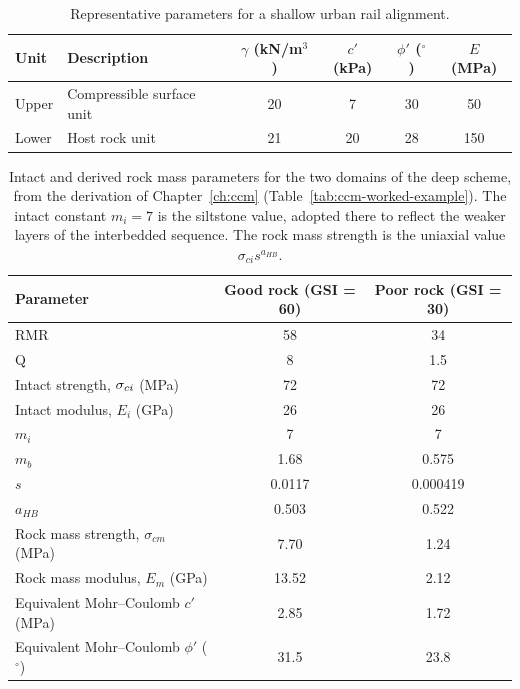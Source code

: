 \begin{table}[htbp]
\caption{Representative parameters for a shallow urban rail alignment.}
\label{tab:shallow-alignment-params}
\centering
\small
\begin{tabular}{l l c c c c}
\toprule
\textbf{Unit} & \textbf{Description} & $\gamma$ (kN/m$^3$) & $c'$ (kPa) & $\phi'$ ($^\circ$) & $E$ (MPa) \\
\midrule
Upper & Compressible surface unit & 20 & 7 & 30 & 50 \\
Lower & Host rock unit & 21 & 20 & 28 & 150 \\
\bottomrule
\end{tabular}
\end{table}

\begin{table}[htbp]
\caption{Intact and derived rock mass parameters for the two domains of the deep scheme, from the derivation of Chapter~\ref{ch:ccm} (Table~\ref{tab:ccm-worked-example}). The intact constant $m_i = 7$ is the siltstone value, adopted there to reflect the weaker layers of the interbedded sequence. The rock mass strength is the uniaxial value $\sigma_{ci} s^{a_{HB}}$.}
\label{tab:deep-scheme-params}
\centering
\small
\begin{tabular}{l c c}
\toprule
\textbf{Parameter} & \textbf{Good rock (GSI = 60)} & \textbf{Poor rock (GSI = 30)} \\
\midrule
RMR & 58 & 34 \\
Q & 8 & 1.5 \\
Intact strength, $\sigma_{ci}$ (MPa) & 72 & 72 \\
Intact modulus, $E_i$ (GPa) & 26 & 26 \\
$m_i$ & 7 & 7 \\
$m_b$ & 1.68 & 0.575 \\
$s$ & 0.0117 & 0.000419 \\
$a_{HB}$ & 0.503 & 0.522 \\
Rock mass strength, $\sigma_{cm}$ (MPa) & 7.70 & 1.24 \\
Rock mass modulus, $E_m$ (GPa) & 13.52 & 2.12 \\
Equivalent Mohr--Coulomb $c'$ (MPa) & 2.85 & 1.72 \\
Equivalent Mohr--Coulomb $\phi'$ ($^\circ$) & 31.5 & 23.8 \\
\bottomrule
\end{tabular}
\end{table}

